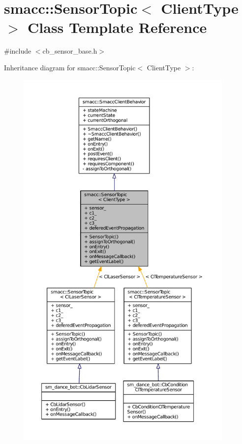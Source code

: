 \hypertarget{classsmacc_1_1SensorTopic}{}\section{smacc\+:\+:Sensor\+Topic$<$ Client\+Type $>$ Class Template Reference}
\label{classsmacc_1_1SensorTopic}


{\ttfamily \#include $<$cb\+\_\+sensor\+\_\+base.\+h$>$}



Inheritance diagram for smacc\+:\+:Sensor\+Topic$<$ Client\+Type $>$\+:
\nopagebreak
\begin{figure}[H]
\begin{center}
\leavevmode
\includegraphics[height=550pt]{classsmacc_1_1SensorTopic__inherit__graph}
\end{center}
\end{figure}


